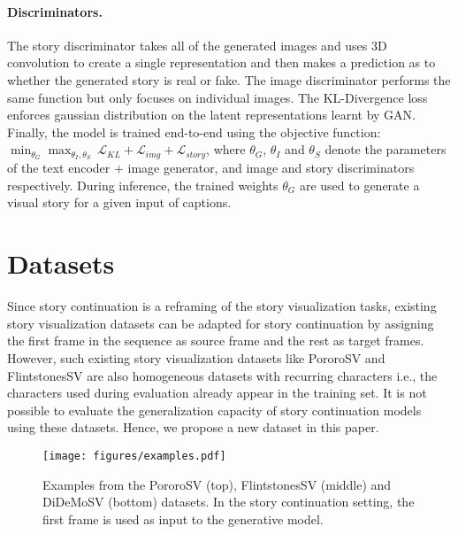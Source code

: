 \documentclass[runningheads]{llncs}
\begin{document}
\paragraph{Discriminators.}
The story discriminator takes all of the generated images and uses 3D convolution to create a single representation and then makes a prediction as to whether the generated story is real or fake. The image discriminator performs the same function but only focuses on individual images. The KL-Divergence loss enforces gaussian distribution on the latent representations learnt by GAN. Finally, the model is trained end-to-end using the objective function: $\min_{\theta_{G}} \max_{\theta_{I},\theta_{S}} \> \mathcal{L}_{KL} + \mathcal{L}_{img} + \mathcal{L}_{story}$, where $\theta_{G}$, $\theta_{I}$ and $\theta_{S}$ denote the parameters of the text encoder $+$ image generator, and image and story discriminators respectively. During inference, the trained weights $\theta_{G}$ are used to generate a visual story for a given input of captions.



\section{Datasets} \label{sec:datasets}

Since story continuation is a reframing of the story visualization tasks, existing story visualization datasets can be adapted for story continuation by assigning the first frame in the sequence as source frame and the rest as target frames. However, such existing story visualization datasets like PororoSV \cite{li2019storygan} and FlintstonesSV \cite{gupta2018imagine} are also homogeneous datasets with recurring characters i.e., the characters used during evaluation already appear in the training set. It is not possible to evaluate the generalization capacity of story continuation models using these datasets. Hence, we propose a new dataset in this paper.

\begin{figure*}[t]
    \centering
    \texttt{[image: figures/examples.pdf]}
    \caption{Examples from the PororoSV (top), FlintstonesSV (middle) and DiDeMoSV (bottom) datasets. In the story continuation setting, the first frame is used as input to the generative model.}
    \label{fig:example}
\end{figure*}
\end{document}
